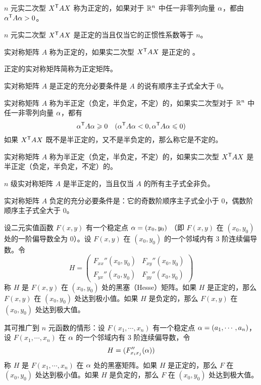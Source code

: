 \begin{definition}
    $n$ 元实二次型 ${X}^\mathsf{T}AX$ 称为正定的，如果对于 $\mathbb{R}^n$ 中任一非零列向量 $\alpha$，都由 ${\alpha}^\mathsf{T}A\alpha>0$。
\end{definition}

\begin{theorem}
    $n$ 元实二次型 ${X}^\mathsf{T}AX$ 是正定的当且仅当它的正惯性系数等于 $n$。
\end{theorem}

\begin{definition}
    实对称矩阵 $A$ 称为正定的，如果实二次型 ${X}^\mathsf{T}AX$ 是正定的 。
\end{definition}

正定的实对称矩阵简称为正定矩阵。

\begin{theorem}
    实对称矩阵 $A$ 是正定的充分必要条件是 $A$ 的说有顺序主子式全大于 $0$。
\end{theorem}

\begin{definition}
    实对称矩阵 $A$ 称为半正定（负定，半负定，不定）的，如果实二次型对于 $\mathbb{R}^n$ 中任一非零列向量 $\alpha$，都有
    \[{\alpha}^\mathsf{T}A\alpha \geqslant 0 \quad ({\alpha}^\mathsf{T}A\alpha<0,{\alpha}^\mathsf{T}A\alpha\leqslant 0)\]
    如果 ${X}^\mathsf{T}AX$ 既不是半正定的，又不是半负定的，那么称它是不定的。
\end{definition}

\begin{definition}
    实对称矩阵 $A$ 称为半正定（负定，半负定，不定）的，如果实二次型 ${X}^\mathsf{T}AX$ 是半正定（负定，半负定，不定）的。
\end{definition}

\begin{theorem}
    $n$ 级实对称矩阵 $A$ 是半正定的，当且仅当 $A$ 的所有主子式全非负。
\end{theorem}

\begin{theorem}
    实对称矩阵 $A$ 负定的充分必要条件是：它的奇数阶顺序主子式全小于 $0$，偶数阶顺序主子式全大于 $0$。
\end{theorem}

\begin{theorem}
    设二元实值函数 $F(x,y)$ 有一个稳定点 $\alpha=(x_0,y_0)$ （即 $F(x,y)$ 在 $(x_0,y_0)$ 处的一阶偏导数全为 $0$）。设 $F(x,y)$ 在 $(x_0,y_0)$ 的一个邻域内有 3 阶连续偏导数。令
    \[H = \left(\begin{matrix}
        F_{xx}''(x_0,y_0) & F_{xy}''(x_0,y_0)\\
        F_{yx}''(x_0,y_0) & F_{yy}''(x_0,y_0)
    \end{matrix}\right)\]
    称 $H$ 是 $F(x,y)$ 在 $(x_0,y_0)$ 处的黑塞（Hesse）矩阵。如果 $H$ 是正定的，那么 $F(x,y)$ 在 $(x_0,y_0)$ 处达到极小值。如果 $H$ 是负定的，那么 $F(x,y)$ 在 $(x_0,y_0)$ 处达到极大值。
\end{theorem}

其可推广到 $n$ 元函数的情形：设 $F(x_1,\cdots,x_n)$ 有一个稳定点 $\alpha = (a_1,\cdots,a_n)$，设 $F(x_1,\cdots,x_n)$ 在 $\alpha$ 的一个邻域内有 3 阶连续偏导数，令
\[H = (F_{x_ix_j}''(\alpha))\]
称 $H$ 是 $F(x_1,\cdots,x_n)$ 在 $\alpha$ 处的黑塞矩阵。如果 $H$ 是正定的，那么 $F$ 在 $(x_0,y_0)$ 处达到极小值。如果 $H$ 是负定的，那么 $F$ 在 $(x_0,y_0)$ 处达到极大值。